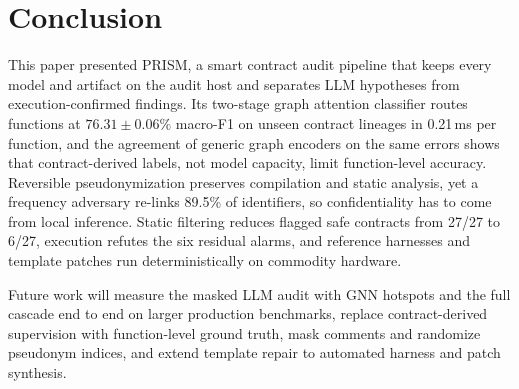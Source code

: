 \documentclass[runningheads]{llncs}
\begin{document}
\section{Conclusion}
\label{sec:conclusion}

This paper presented PRISM, a smart contract audit pipeline that keeps every model and artifact on the audit host and separates LLM hypotheses from execution-confirmed findings. Its two-stage graph attention classifier routes functions at $76.31\pm0.06\%$ macro-F1 on unseen contract lineages in 0.21\,ms per function, and the agreement of generic graph encoders on the same errors shows that contract-derived labels, not model capacity, limit function-level accuracy. Reversible pseudonymization preserves compilation and static analysis, yet a frequency adversary re-links 89.5\% of identifiers, so confidentiality has to come from local inference. Static filtering reduces flagged safe contracts from 27/27 to 6/27, execution refutes the six residual alarms, and reference harnesses and template patches run deterministically on commodity hardware.

Future work will measure the masked LLM audit with GNN hotspots and the full cascade end to end on larger production benchmarks, replace contract-derived supervision with function-level ground truth, mask comments and randomize pseudonym indices, and extend template repair to automated harness and patch synthesis.



\end{document}
